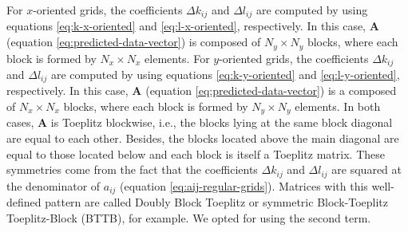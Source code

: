 \documentclass[manuscript,revised]{geophysics}
\begin{document}
For $x$-oriented grids, the coefficients $\Delta k_{ij}$ and $\Delta l_{ij}$ are 
computed by using equations \ref{eq:k-x-oriented} and \ref{eq:l-x-oriented}, respectively.
In this case, $\mathbf{A}$ (equation \ref{eq:predicted-data-vector}) is 
composed of $N_{y} \times N_{y}$ blocks, where each block is formed by $N_{x} \times N_{x}$ elements.
For $y$-oriented grids, the coefficients $\Delta k_{ij}$ and $\Delta l_{ij}$ are 
computed by using equations \ref{eq:k-y-oriented} and \ref{eq:l-y-oriented}, respectively.
In this case, $\mathbf{A}$ (equation \ref{eq:predicted-data-vector}) is a 
composed of $N_{x} \times N_{x}$ blocks, where each block is formed by $N_{y} \times N_{y}$ elements.
In both cases, $\mathbf{A}$ is Toeplitz blockwise, i.e., the blocks lying at the same block 
diagonal are equal to each other.
Besides, the blocks located above the main diagonal are equal to those 
located below and each block is itself a Toeplitz matrix.
These symmetries come from the fact that the coefficients
$\Delta k_{ij}$ and $\Delta l_{ij}$ are squared at the denominator of 
$a_{ij}$ (equation \ref{eq:aij-regular-grids}).
Matrices with this well-defined pattern are called 
Doubly Block Toeplitz \citep[][ p. 28]{jain1989} or symmetric Block-Toeplitz Toeplitz-Block (BTTB),
for example. We opted for using the second term.
\end{document}
